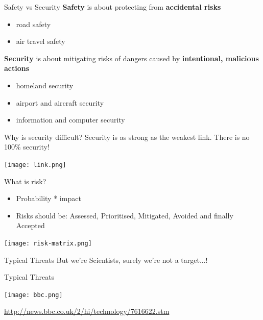 \documentclass[aspectratio=169]{beamer}
\begin{document}
\begin{frame}{Safety vs Security}
\textbf{Safety} is about protecting from \textbf{accidental risks} 
\begin{itemize}
\item road safety
\item  air travel safety
\end{itemize}
\textbf{Security} is about mitigating risks of dangers
caused by \textbf{intentional, malicious actions} 
\begin{itemize}
\item homeland security
\item airport and aircraft security
\item information and computer security
\end{itemize}
\end{frame}

\begin{frame}{Why is security difficult?}
Security is as strong as the weakest link. There is no 100\% security!
\begin{center}
\texttt{[image: link.png]}
\end{center}
\end{frame}

\begin{frame}{What is risk?}
    \begin{itemize}
		\item Probability * impact
		\item Risks should be: Assessed, Prioritised, Mitigated, Avoided and finally Accepted
	\end{itemize}
    \begin{center} 
      \texttt{[image: risk-matrix.png]} 
    \end{center}
\end{frame}

\begin{frame}{Typical Threats}
\center 
But we're Scientists, surely we're not a target...! 
\end{frame}

\begin{frame}{Typical Threats}
  \begin{center}
		\texttt{[image: bbc.png]} \newline
        {\small \url{http://news.bbc.co.uk/2/hi/technology/7616622.stm} \par}
  \end{center}
\end{frame}
\end{document}

